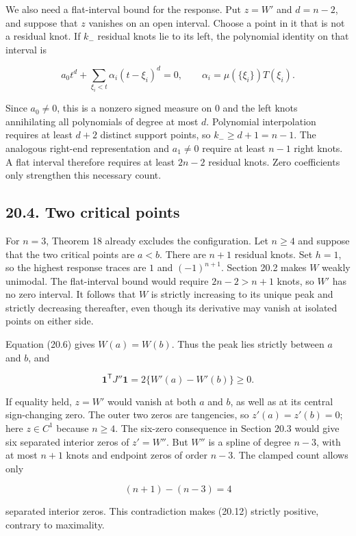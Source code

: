 \documentclass[11pt]{article}
\begin{document}
We also need a flat-interval bound for the response. Put \(z=W'\) and
\(d=n-2\), and suppose that \(z\) vanishes on an open interval. Choose a
point in it that is not a residual knot. If \(k_-\) residual knots lie
to its left, the polynomial identity on that interval is

\[
a_0t^d+\sum_{\xi_i<t}\alpha_i(t-\xi_i)^d=0,
\qquad \alpha_i=\mu(\{\xi_i\})T(\xi_i).
\tag{20.11}
\]

Since \(a_0\ne0\), this is a nonzero signed measure on \(0\) and the
left knots annihilating all polynomials of degree at most \(d\).
Polynomial interpolation requires at least \(d+2\) distinct support
points, so \(k_-\ge d+1=n-1\). The analogous right-end representation
and \(a_1\ne0\) require at least \(n-1\) right knots. A flat interval
therefore requires at least \(2n-2\) residual knots. Zero coefficients
only strengthen this necessary count.

\subsection{20.4. Two critical points}\label{two-critical-points}

For \(n=3\), Theorem 18 already excludes the configuration. Let
\(n\ge4\) and suppose that the two critical points are \(a<b\). There
are \(n+1\) residual knots. Set \(h=1\), so the highest response traces
are \(1\) and \((-1)^{n+1}\). Section 20.2 makes \(W\) weakly unimodal.
The flat-interval bound would require \(2n-2>n+1\) knots, so \(W'\) has
no zero interval. It follows that \(W\) is strictly increasing to its
unique peak and strictly decreasing thereafter, even though its
derivative may vanish at isolated points on either side.

Equation (20.6) gives \(W(a)=W(b)\). Thus the peak lies strictly between
\(a\) and \(b\), and

\[
\mathbf1^{\mathsf T}J''\mathbf1
=2\{W'(a)-W'(b)\}\ge0.
\tag{20.12}
\]

If equality held, \(z=W'\) would vanish at both \(a\) and \(b\), as well
as at its central sign-changing zero. The outer two zeros are
tangencies, so \(z'(a)=z'(b)=0\); here \(z\in C^1\) because \(n\ge4\).
The six-zero consequence in Section 20.3 would give six separated
interior zeros of \(z'=W''\). But \(W''\) is a spline of degree \(n-3\),
with at most \(n+1\) knots and endpoint zeros of order \(n-3\). The
clamped count allows only

\[
(n+1)-(n-3)=4
\tag{20.13}
\]

separated interior zeros. This contradiction makes (20.12) strictly
positive, contrary to maximality.
\end{document}
